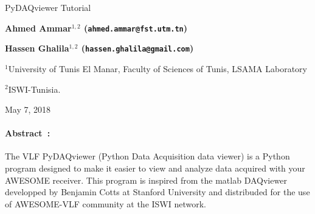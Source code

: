\documentclass[%
oneside,                 %
final,                   %
10pt]{article}
\begin{document}

\newcommand{\exercisesection}[1]{\subsection*{#1}}






\thispagestyle{empty}

\begin{center}
{\LARGE\bf
\begin{spacing}{1.25}
PyDAQviewer Tutorial
\end{spacing}
}
\end{center}


\begin{center}
{\bf Ahmed Ammar${}^{1, 2}$ (\texttt{ahmed.ammar@fst.utm.tn})} \\ [0mm]
\end{center}


\begin{center}
{\bf Hassen Ghalila${}^{1, 2}$ (\texttt{hassen.ghalila@gmail.com})} \\ [0mm]
\end{center}

\begin{center}
\centerline{{\small ${}^1$University of Tunis El Manar, Faculty of Sciences of Tunis, LSAMA Laboratory}}
\centerline{{\small ${}^2$ISWI-Tunisia.}}
\end{center}
    


\begin{center}
May 7, 2018
\end{center}

\vspace{1cm}


\paragraph{Abstract :}
The VLF PyDAQviewer (Python Data Acquisition data viewer) is a Python program designed to make it easier to view and analyze data acquired with your AWESOME receiver. This program is inspired from the matlab DAQviewer developped by Benjamin Cotts at Stanford University and distribuded for the use of AWESOME-VLF community at the ISWI network.
\end{document}
